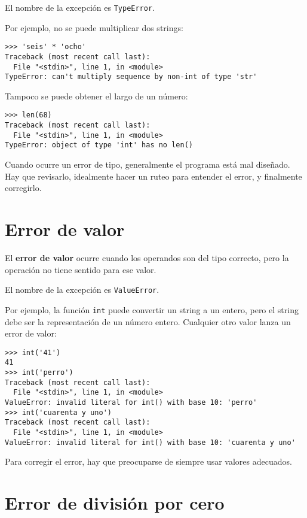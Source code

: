 El nombre de la excepción es \lstinline!TypeError!.

Por ejemplo, no se puede multiplicar dos strings:

\begin{lstlisting}
>>> 'seis' * 'ocho'
Traceback (most recent call last):
  File "<stdin>", line 1, in <module>
TypeError: can't multiply sequence by non-int of type 'str'
\end{lstlisting}

Tampoco se puede obtener el largo de un número:

\begin{lstlisting}
>>> len(68)
Traceback (most recent call last):
  File "<stdin>", line 1, in <module>
TypeError: object of type 'int' has no len()
\end{lstlisting}

Cuando ocurre un error de tipo, generalmente el programa está mal
diseñado. Hay que revisarlo, idealmente hacer un ruteo para entender el
error, y finalmente corregirlo.

\section{Error de valor}

El \textbf{error de valor} ocurre cuando los operandos son del tipo
correcto, pero la operación no tiene sentido para ese valor.

El nombre de la excepción es \lstinline!ValueError!.

Por ejemplo, la función \lstinline!int! puede convertir un string a un
entero, pero el string debe ser la representación de un número entero.
Cualquier otro valor lanza un error de valor:

\begin{lstlisting}
>>> int('41')
41
>>> int('perro')
Traceback (most recent call last):
  File "<stdin>", line 1, in <module>
ValueError: invalid literal for int() with base 10: 'perro'
>>> int('cuarenta y uno')
Traceback (most recent call last):
  File "<stdin>", line 1, in <module>
ValueError: invalid literal for int() with base 10: 'cuarenta y uno'
\end{lstlisting}

Para corregir el error, hay que preocuparse de siempre usar valores
adecuados.

\section{Error de división por cero}

